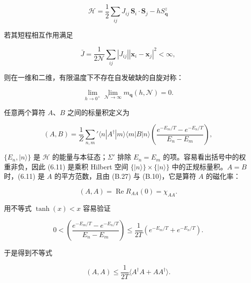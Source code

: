 \begin{equation*}
\mathcal {H} = \frac {1}{2} \sum_ {ij} J _ {ij} \, \mathbf {S} _ {i} \cdot \mathbf {S} _ {j} - h S _ {\mathbf {q}} ^ {z}
\tag{6.8}
\end{equation*}

若其短程相互作用满足

\begin{equation*}
\bar {J} = \frac {1}{2 \mathcal {N}} \sum_ {ij} \left| J _ {ij} \right| \left| \mathbf {x} _ {i} - \mathbf {x} _ {j} \right| ^ {2} < \infty ,
\tag{6.9}
\end{equation*}

则在一维和二维，有限温度下不存在自发破缺的自旋对称：

\begin{equation*}
\lim _ {h \to 0 ^ {+}} \lim _ {\mathcal {N} \to \infty} m _ {\mathbf {q}} ( h, \mathcal {N} ) = 0.
\tag{6.10}
\end{equation*}
\medskip

任意两个算符 $A$、$B$ 之间的标量积定义为

\begin{equation*}
( A, B ) = \frac {1}{Z} \sum_{n, m} ' \langle n | A ^ {\dagger} | m \rangle \langle m | B | n \rangle \left( \frac {e ^ {- E _ {m} / T} - e ^ {- E _ {n} / T}}{E _ {n} - E _ {m}} \right),
\tag{6.11}
\end{equation*}

$\{E_{n},|n\rangle\}$ 是 $\mathcal{H}$ 的能量与本征态；$\Sigma'$ 排除 $E_{n}=E_{m}$ 的项。容易看出括号中的权重非负，因此 (6.11) 是乘积 Hilbert 空间 $\{|n\rangle\}\times\{|n\rangle\}$ 中的正规标量积。$A=B$ 时，(6.11) 是 $A$ 的平方范数，且由 (B.27) 与 (B.10)，它是算符 $A$ 的磁化率：

\begin{equation*}
( A, A ) = \operatorname{Re} R _ {AA} ( 0 ) = \chi_ {AA}.
\tag{6.12}
\end{equation*}

用不等式 $\tanh(x) < x$ 容易验证

\begin{equation*}
0 < \left( \frac {e ^ {- E _ {m} / T} - e ^ {- E _ {n} / T}}{E _ {n} - E _ {m}} \right) \leq \frac {1}{2 T} \left( e ^ {- E _ {m} / T} + e ^ {- E _ {n} / T} \right).
\tag{6.13}
\end{equation*}

于是得到不等式

\begin{equation*}
( A, A ) \leq \frac {1}{2 T} \langle A ^ {\dagger} A + A A ^ {\dagger} \rangle .
\tag{6.14}
\end{equation*}

